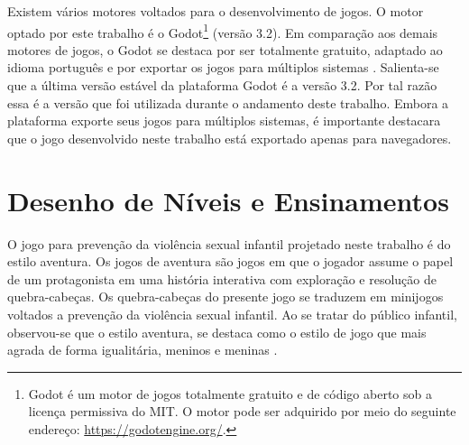 Existem vários motores voltados para o desenvolvimento de jogos. O motor optado por este trabalho é o Godot\footnote{Godot é um motor de jogos totalmente gratuito e de código aberto sob a licença permissiva do MIT. O motor pode ser adquirido por meio do seguinte endereço: \url{https://godotengine.org/}.} (versão 3.2). Em comparação aos demais motores de jogos, o Godot se destaca por ser totalmente gratuito, adaptado ao idioma português e por exportar os jogos para múltiplos sistemas \cite{scherer2020analise}. Salienta-se que a última versão estável da plataforma Godot é a versão 3.2. Por tal razão essa é a versão que foi utilizada durante o andamento deste trabalho. Embora a plataforma exporte seus jogos para múltiplos sistemas, é importante destacara que o jogo desenvolvido neste trabalho está exportado apenas para navegadores. %











\section{Desenho de Níveis e Ensinamentos}\label{sec:DN}

O jogo para prevenção da violência sexual infantil projetado neste trabalho é do estilo aventura. Os jogos de aventura são jogos em que o jogador assume o papel de um protagonista em uma história interativa com exploração e resolução de quebra-cabeças. Os quebra-cabeças do presente jogo se traduzem em minijogos voltados a prevenção da violência sexual infantil. Ao se tratar do público infantil, observou-se que o estilo aventura, se destaca como o estilo de jogo que mais agrada de forma igualitária, meninos e meninas \cite{brandtzaeg2009children}. %

